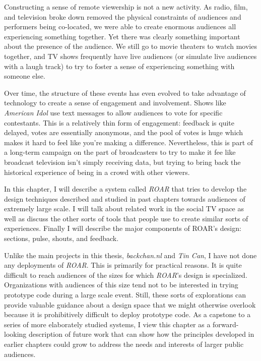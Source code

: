 Constructing a sense of remote viewership is not a new activity. As radio, film, and television broke down removed the physical constraints of audiences and performers being co-located, we were able to create enormous audiences all experiencing something together. Yet there was clearly something important about the presence of the audience. We still go to movie theaters to watch movies together, and TV shows frequently have live audiences (or simulate live audiences with a laugh track) to try to foster a sense of experiencing something with someone else.

Over time, the structure of these events has even evolved to take advantage of technology to create a sense of engagement and involvement. Shows like \emph{American Idol} use text messages to allow audiences to vote for specific contestants. This is a relatively thin form of engagement: feedback is quite delayed, votes are essentially anonymous, and the pool of votes is huge which makes it hard to feel like you're making a difference. Nevertheless, this is part of a long-term campaign on the part of broadcasters to try to make it fee like broadcast television isn't simply receiving data, but trying to bring back the historical experience of being in a crowd with other viewers.

In this chapter, I will describe a system called \emph{ROAR} that tries to develop the design techniques described and studied in past chapters towards audiences of extremely large scale. I will talk about related work in the social TV space as well as discuss the other sorts of tools that people use to create similar sorts of experiences. Finally I will describe the major components of ROAR's design: sections, pulse, shouts, and feedback. 

Unlike the main projects in this thesis, \emph{backchan.nl} and \emph{Tin Can}, I have not done any deployments of \emph{ROAR}. This is primarily for practical reasons. It is quite difficult to reach audiences of the sizes for which \emph{ROAR}'s design is specialized. Organizations with audiences of this size tend not to be interested in trying prototype code during a large scale event. Still, these sorts of explorations can provide valuable guidance about a design space that we might otherwise overlook because it is prohibitively difficult to deploy prototype code. As a capstone to a series of more elaborately studied systems, I view this chapter as a forward-looking description of future work that can show how the principles developed in earlier chapters could grow to address the needs and interests of larger public audiences.

